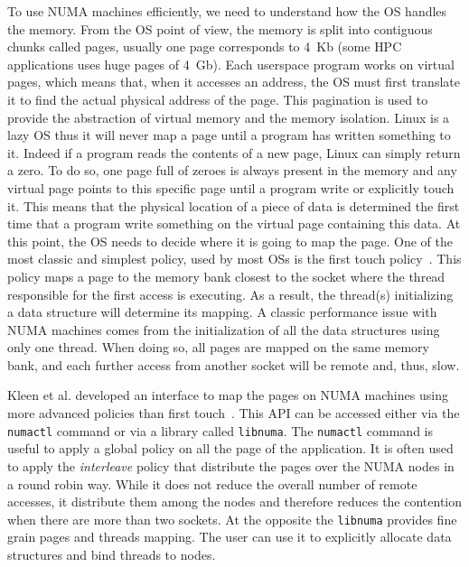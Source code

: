 To use \gls{NUMA} machines efficiently, we need to understand how the \gls{OS} handles the memory.
From the \gls{OS} point of view, the memory is split into contiguous chunks called pages, usually one page corresponds to \SI{4}{Kb} (some \gls{HPC} applications uses huge pages of \SI{4}{Gb}).
Each userspace program works on virtual pages, which means that, when it accesses an address, the \gls{OS} must first translate it to find the actual physical address of the page.
This pagination is used to provide the abstraction of virtual memory and the memory isolation.
\gls{Linux} is a lazy \gls{OS} thus it will never map a page until a program has written something to it.
Indeed if a program reads the contents of a new page, \gls{Linux} can simply return a zero.
To do so, one page full of zeroes is always present in the memory and any virtual page points to this specific page until a program write or explicitly touch it.
This means that the physical location of a piece of data is determined the first time that a program write something on the virtual page containing this data.
At this point, the \gls{OS} needs to decide where it is going to map the page.
One of the most classic and simplest policy, used by most \glspl{OS} is the first touch policy~\cite{Marchetti95Using}.
This policy maps a page to the memory bank closest to the socket where the thread responsible for the first access is executing.
As a result, the thread(s) initializing a data structure will determine its mapping.
A classic performance issue with \gls{NUMA} machines comes from the initialization of all the data structures using only one thread.
When doing so, all pages are mapped on the same memory bank, and each further access from another socket will be remote and, thus, slow.

Kleen et al. developed an interface to map the pages on \gls{NUMA} machines using more advanced policies than first touch~\cite{Kleen05NUMA}.
This \gls{API} can be accessed either via the \texttt{numactl} command or via a library called \texttt{libnuma}.
The \texttt{numactl} command is useful to apply a global policy on all the page of the application.
It is often used to apply the \emph{interleave} policy that distribute the pages over the \gls{NUMA} nodes in a round robin way.
While it does not reduce the overall number of remote accesses, it distribute them among the nodes and therefore reduces the contention when there are more than two sockets.
At the opposite the \texttt{libnuma} provides fine grain pages and threads mapping.
The user can use it to explicitly allocate data structures and bind threads to nodes.

